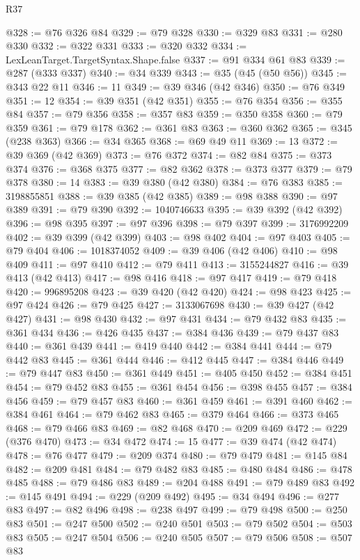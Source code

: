 \begin{lexlean}{R37}
\begin{coremodule}
@328 := @76 @326 @84
@329 := @79 @328
@330 := @329 @83
@331 := @280 @330
@332 := @322 @331
@333 := @320 @332
@334 := LexLeanTarget.TargetSyntax.Shape.false
@337 := @91 @334 @61 @83
@339 := @287 (@333 @337)
@340 := @34 @339
@343 := @35 (@45 (@50 @56))
@345 := @343 @22 @11
@346 := 11
@349 := @39 @346 (@42 @346)
@350 := @76 @349
@351 := 12
@354 := @39 @351 (@42 @351)
@355 := @76 @354
@356 := @355 @84
@357 := @79 @356
@358 := @357 @83
@359 := @350 @358
@360 := @79 @359
@361 := @79 @178
@362 := @361 @83
@363 := @360 @362
@365 := @345 (@238 @363)
@366 := @34 @365
@368 := @69 @49 @11
@369 := 13
@372 := @39 @369 (@42 @369)
@373 := @76 @372
@374 := @82 @84
@375 := @373 @374
@376 := @368 @375
@377 := @82 @362
@378 := @373 @377
@379 := @79 @378
@380 := 14
@383 := @39 @380 (@42 @380)
@384 := @76 @383
@385 := 3198855851
@388 := @39 @385 (@42 @385)
@389 := @98 @388
@390 := @97 @389
@391 := @79 @390
@392 := 1040746633
@395 := @39 @392 (@42 @392)
@396 := @98 @395
@397 := @97 @396
@398 := @79 @397
@399 := 3176992209
@402 := @39 @399 (@42 @399)
@403 := @98 @402
@404 := @97 @403
@405 := @79 @404
@406 := 1018374052
@409 := @39 @406 (@42 @406)
@410 := @98 @409
@411 := @97 @410
@412 := @79 @411
@413 := 3155244827
@416 := @39 @413 (@42 @413)
@417 := @98 @416
@418 := @97 @417
@419 := @79 @418
@420 := 996895208
@423 := @39 @420 (@42 @420)
@424 := @98 @423
@425 := @97 @424
@426 := @79 @425
@427 := 3133067698
@430 := @39 @427 (@42 @427)
@431 := @98 @430
@432 := @97 @431
@434 := @79 @432 @83
@435 := @361 @434
@436 := @426 @435
@437 := @384 @436
@439 := @79 @437 @83
@440 := @361 @439
@441 := @419 @440
@442 := @384 @441
@444 := @79 @442 @83
@445 := @361 @444
@446 := @412 @445
@447 := @384 @446
@449 := @79 @447 @83
@450 := @361 @449
@451 := @405 @450
@452 := @384 @451
@454 := @79 @452 @83
@455 := @361 @454
@456 := @398 @455
@457 := @384 @456
@459 := @79 @457 @83
@460 := @361 @459
@461 := @391 @460
@462 := @384 @461
@464 := @79 @462 @83
@465 := @379 @464
@466 := @373 @465
@468 := @79 @466 @83
@469 := @82 @468
@470 := @209 @469
@472 := @229 (@376 @470)
@473 := @34 @472
@474 := 15
@477 := @39 @474 (@42 @474)
@478 := @76 @477
@479 := @209 @374
@480 := @79 @479
@481 := @145 @84
@482 := @209 @481
@484 := @79 @482 @83
@485 := @480 @484
@486 := @478 @485
@488 := @79 @486 @83
@489 := @204 @488
@491 := @79 @489 @83
@492 := @145 @491
@494 := @229 (@209 @492)
@495 := @34 @494
@496 := @277 @83
@497 := @82 @496
@498 := @238 @497
@499 := @79 @498
@500 := @250 @83
@501 := @247 @500
@502 := @240 @501
@503 := @79 @502
@504 := @503 @83
@505 := @247 @504
@506 := @240 @505
@507 := @79 @506
@508 := @507 @83

\end{coremodule}
\end{lexlean}
